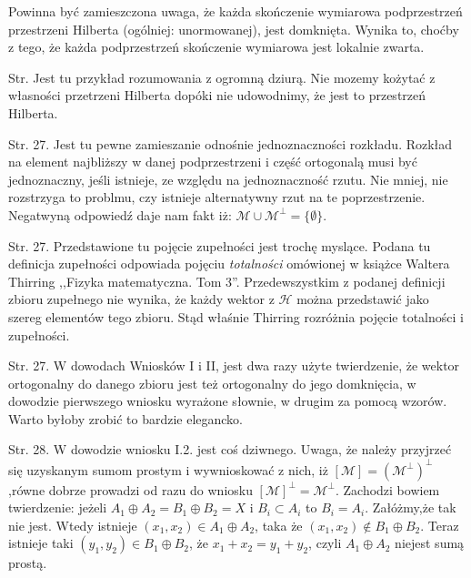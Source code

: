 \documentclass[a4paper,11pt]{article}
\begin{document}
\vspace{\spaceTwo}














Powinna być zamieszczona uwaga, że każda skończenie wymiarowa
  podprzestrzeń przestrzeni Hilberta (ogólniej: unormowanej), jest
  domknięta. Wynika to, choćby z tego, że każda podprzestrzeń
  skończenie wymiarowa jest lokalnie zwarta.

 Str. Jest tu przykład rozumowania z ogromną dziurą. Nie mozemy
  kożytać z własności przetrzeni Hilberta dopóki nie udowodnimy, że
  jest to przestrzeń Hilberta.

 Str. 27. Jest tu pewne zamieszanie odnośnie jednoznaczności
  rozkładu. Rozkład na element najbliższy w danej podprzestrzeni i
  część ortogonalą musi być jednoznaczny, jeśli istnieje, ze względu
  na jednoznaczność rzutu. Nie mniej, nie rozstrzyga to problmu, czy
  istnieje alternatywny rzut na te poprzestrzenie. Negatwyną odpowiedź
  daje nam fakt iż:
  $\mathcal{ M } \cup \mathcal{ M }^{ \bot } = \{ \emptyset \}$.

 Str. 27. Przedstawione tu pojęcie zupełności jest trochę
  myslące. Podana tu definicja zupełności odpowiada pojęciu
  \emph{totalności} omówionej w książce Waltera Thirring ,,Fizyka
  matematyczna. Tom 3''. Przedewszystkim z podanej definicji zbioru
  zupełnego nie wynika, że każdy wektor z $\mathcal{ H }$ można
  przedstawić jako szereg elementów tego zbioru. Stąd właśnie Thirring
  rozróżnia pojęcie totalności i zupełności.

 Str. 27. W dowodach Wniosków I i II, jest dwa razy użyte
  twierdzenie, że wektor ortogonalny do danego zbioru jest też
  ortogonalny do jego domknięcia, w dowodzie pierwszego wniosku
  wyrażone słownie, w drugim za pomocą wzorów. Warto byłoby zrobić to
  bardzie elegancko.

 Str. 28. W dowodzie wniosku I.2. jest coś dziwnego. Uwaga, że
  należy przyjrzeć się uzyskanym sumom prostym i wywnioskować z nich,
  iż $[ \mathcal{ M } ]=( \mathcal{ M }^{ \bot } )^{ \bot }$,równe
  dobrze prowadzi od razu do wniosku
  $[ \mathcal{ M } ]^{ \bot } = \mathcal{ M }^{ \bot }$. Zachodzi
  bowiem twierdzenie: jeżeli
  $A_{ 1 } \oplus A_{ 2 } = B_{ 1 } \oplus B_{ 2 } = X$ i
  $B_{ i } \subset A_{ i }$ to $B_{ i } = A_{ i }$. Załóżmy,że tak nie
  jest. Wtedy istnieje
  $( x_{ 1 }, x_{ 2 } ) \in A_{ 1 } \oplus A_{ 2 }$, taka że
  $( x_{ 1 }, x_{ 2 } ) \notin B_{ 1 } \oplus B_{ 2 }$. Teraz istnieje
  taki $( y_{ 1 }, y_{ 2 } ) \in B_{ 1 } \oplus B_{ 2 }$, że
  $x_{ 1 } + x_{ 2 } = y_{ 1 } + y_{ 2 }$, czyli
  $A_{ 1 } \oplus A_{ 2 }$ niejest sumą prostą.
\end{document}
